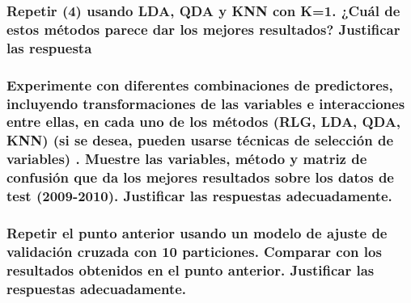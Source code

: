 \subsubsection{Repetir (4) usando LDA, QDA y KNN con K=1. ¿Cuál de estos métodos parece dar los mejores resultados? Justificar las respuesta}


\subsubsection{Experimente con diferentes combinaciones de predictores, incluyendo transformaciones de las variables e interacciones entre ellas, en cada uno de los métodos (RLG, LDA, QDA, KNN) (si se desea, pueden usarse técnicas de selección de variables) . Muestre las variables, método y matriz de confusión que da los mejores resultados sobre los datos de test (2009-2010). Justificar las respuestas adecuadamente.}


\subsubsection{Repetir el punto anterior usando un modelo de ajuste de validación cruzada con 10 particiones. Comparar con los resultados obtenidos en el punto anterior. Justificar las respuestas adecuadamente.}


